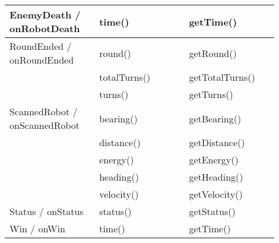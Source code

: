 \begin{center}
\begin{tabular}{ | p{0.3\linewidth} | p{0.3\linewidth} | p{0.3\linewidth} |}
		EnemyDeath / onRobotDeath & time() & getTime() \\ \hline
		RoundEnded / onRoundEnded & round() & getRound() \\ \hline
		& totalTurns() & getTotalTurns() \\ \hline
		& turns() & getTurns() \\ \hline
		ScannedRobot / onScannedRobot & bearing() & getBearing() \\ \hline
		& distance() & getDistance() \\ \hline
		& energy() & getEnergy() \\ \hline
		& heading() & getHeading() \\ \hline
		& velocity() & getVelocity() \\ \hline
		Status / onStatus & status() & getStatus() \\ \hline
		Win / onWin & time() & getTime() \\
		\hline
	\end{tabular}
\end{center}